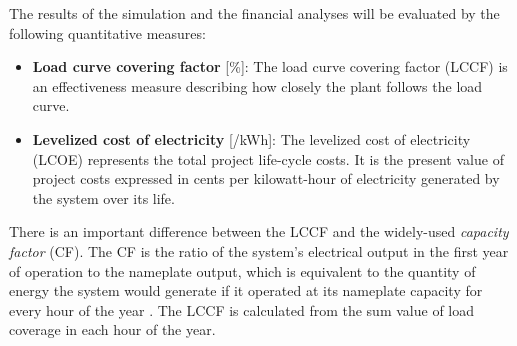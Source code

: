 The results of the simulation and the financial analyses will be evaluated by the following quantitative measures:
\begin{itemize}
\item \textbf{Load curve covering factor} [\%]: The load curve covering factor (LCCF) is an effectiveness measure describing how closely the plant follows the load curve.
\item \textbf{Levelized cost of electricity} [\textcent /kWh]: The levelized cost of electricity (LCOE) represents the total project life-cycle costs. It is the present value of project costs expressed in cents per kilowatt-hour of electricity generated by the system over its life. \cite{NREL2015a}
\end{itemize}
There is an important difference between the LCCF and the widely-used \emph{capacity factor} (CF). The CF is the ratio of the system's electrical output in the first year of operation to the nameplate output, which is equivalent to the quantity of energy the system would generate if it operated at its nameplate capacity for every hour of the year \cite{NREL2015a}. The LCCF is calculated from the sum value of load coverage in each hour of the year.

